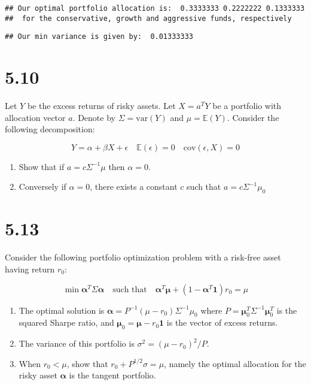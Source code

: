 \documentclass[11pt,]{article}
\newcommand{\V}[1]{{\bm{{#1}}}}
\begin{document}
\begin{verbatim}
## Our optimal portfolio allocation is:  0.3333333 0.2222222 0.1333333 
##  for the conservative, growth and aggressive funds, respectively
\end{verbatim}

\begin{verbatim}
## Our min variance is given by:  0.01333333
\end{verbatim}

\newpage

\section{5.10}\label{section-2}

Let \(Y\) be the excess returns of risky assets. Let \(X = a^TY\) be a
portfolio with allocation vector \(a\). Denote by
\(\Sigma = \text{var}(Y)\) and \(\mu = \mathbb{E}(Y)\). Consider the
following decomposition:

\[
Y = \alpha + \beta X + \epsilon \quad \mathbb{E}(\epsilon) = 0 \quad \text{cov}(\epsilon, X) = 0
\]

\begin{enumerate}
\def\labelenumi{\arabic{enumi}.}
\item
  Show that if \(a = c\Sigma^{-1}\mu\) then \(\alpha =0\).
\item
  Conversely if \(\alpha = 0\), there exists a constant \(c\) such that
  \(a = c\Sigma^{-1}\mu_0\)
\end{enumerate}

\newpage

\section{5.13}\label{section-3}

Consider the following portfolio optimization problem with a risk-free
asset having return \(r_0\):

\[
\min{\V{\alpha}^T \Sigma \V{\alpha}} \quad \text{such that} \quad \V{\alpha}^T \V{\mu} + (1-\V{\alpha}^T\V{1}) r_0 = \mu
\]

\begin{enumerate}
\def\labelenumi{\arabic{enumi}.}
\item
  The optimal solution is
  \(\V{\alpha} = P^{-1} (\mu-r_0)\Sigma^{-1}\mu_0\) where
  \(P = \V{\mu}_0^T \Sigma^{-1} \V{\mu}_0^T\) is the squared Sharpe
  ratio, and \(\V{\mu}_0 = \V{\mu}-r_0\V{1}\) is the vector of excess
  returns.
\item
  The variance of this portfolio is \(\sigma^2 = (\mu - r_0)^2 / P\).
\item
  When \(r_0 < \mu\), show that \(r_0 + P^{1/2} \sigma = \mu\), namely
  the optimal allocation for the risky asset \(\V{\alpha}\) is the
  tangent portfolio.
\end{enumerate}
\end{document}

